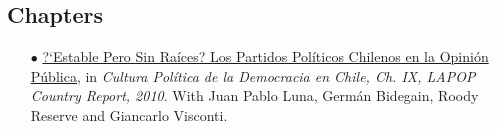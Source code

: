 

\subsection*{Chapters}

\begin{itemize}
\item[$\bullet$] \href{http://www.vanderbilt.edu/lapop/chile/Chile-2010-cultura-politica.pdf}{?`Estable Pero Sin Ra\'ices? Los Partidos Pol\'iticos Chilenos en la Opini\'on P\'ublica}, in \emph{Cultura Pol\'itica de la Democracia en Chile, Ch. IX, LAPOP Country Report, 2010}. With Juan Pablo Luna, Germ\'an Bidegain, Roody Reserve and Giancarlo Visconti.
\end{itemize}

